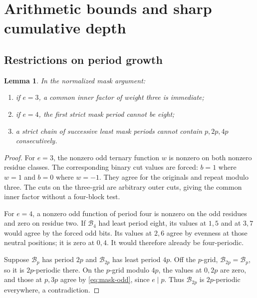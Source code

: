 \documentclass[11pt,a4paper]{amsart}
\numberwithin{equation}{section}
\theoremstyle{plain}
\newtheorem{lemma}[theorem]{Lemma}
\theoremstyle{definition}
\begin{document}
\section{Arithmetic bounds and sharp cumulative depth}\label{sec:depth}

\subsection{Restrictions on period growth}
\begin{lemma}\label{lem:ratios}
In the normalized mask argument:
\begin{enumerate}
\item if \(e=3\), a common inner factor of weight three is immediate;
\item if \(e=4\), the first strict mask period cannot be eight;
\item a strict chain of successive least mask periods cannot contain \(p,2p,4p\) consecutively.
\end{enumerate}
\end{lemma}
\begin{proof}
For \(e=3\), the nonzero odd ternary function \(w\) is nonzero on both
nonzero residue classes.  The corresponding binary cut values are forced:
\(b=1\) where \(w=1\) and \(b=0\) where \(w=-1\).  They agree for the originals
and repeat modulo three.  The cuts on the three-grid are arbitrary outer
cuts, giving the common inner factor without a four-block test.

For \(e=4\), a nonzero odd function of period four is nonzero on the odd
residues and zero on residue two.  If \(\mathcal B_4\) had least period eight, its
values at \(1,5\) and at \(3,7\) would agree by the forced odd bits.  Its
values at \(2,6\) agree by evenness at those neutral positions; it is zero
at \(0,4\).  It would therefore already be four-periodic.

Suppose \(\mathcal B_p\) has period \(2p\) and \(\mathcal B_{2p}\) has least period \(4p\).
Off the \(p\)-grid, \(\mathcal B_{2p}=\mathcal B_p\), so it is \(2p\)-periodic there.
On the \(p\)-grid modulo \(4p\), the values at \(0,2p\) are zero, and those at
\(p,3p\) agree by \eqref{eq:mask-odd}, since \(e\mid p\).  Thus \(\mathcal B_{2p}\) is
\(2p\)-periodic everywhere, a contradiction.
\end{proof}
\end{document}
